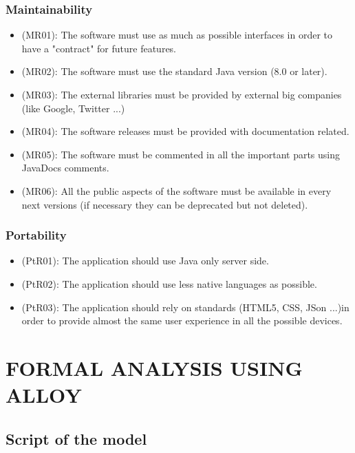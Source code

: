 \documentclass[a4paper,leqno]{book}
\begin{document}
\subsection{Maintainability}
\begin{itemize}
\item (MR01): The software must use as much as possible interfaces in order to have a "contract" for future features.
\item (MR02): The software must use the standard Java version (8.0 or later).
\item (MR03): The external libraries must be provided by external big companies (like Google, Twitter ...)
\item (MR04): The software releases must be provided with documentation related.
\item (MR05): The software must be commented in all the important parts using JavaDocs comments.
\item (MR06): All the public aspects of the software must be available in every next versions (if necessary they can be deprecated but not deleted).
\end{itemize}

\subsection{Portability}
\begin{itemize}
\item (PtR01): The application should use Java only server side.
\item (PtR02): The application should use less native languages as possible.
\item (PtR03): The application should rely on standards (HTML5, CSS, JSon ...)in order to provide almost the same user experience in all the possible devices.
\end{itemize}

\chapter{FORMAL ANALYSIS USING ALLOY}

\section{Script of the model}
\end{document}
